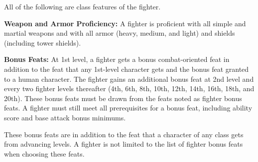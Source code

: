 \ClassFeatures

All of the following are class features of the fighter.

\textbf{Weapon and Armor Proficiency:} A fighter is proficient with all simple 
and martial weapons and with all armor (heavy, medium, and light) and shields (including 
tower shields).

\textbf{Bonus Feats:} At 1st level, a fighter gets a bonus combat-oriented feat 
in addition to the feat that any 1st-level character gets and the bonus feat granted 
to a human character. The fighter gains an additional bonus feat at 2nd level and 
every two fighter levels thereafter (4th, 6th, 8th, 10th, 12th, 14th, 16th, 18th, 
and 20th). These bonus feats must be drawn from the feats noted as fighter bonus 
feats. A fighter must still meet all prerequisites for a bonus feat, including 
ability score and base attack bonus minimums.

These bonus feats are in addition to the feat that a character of any class gets 
from advancing levels. A fighter is not limited to the list of fighter bonus feats 
when choosing these feats.